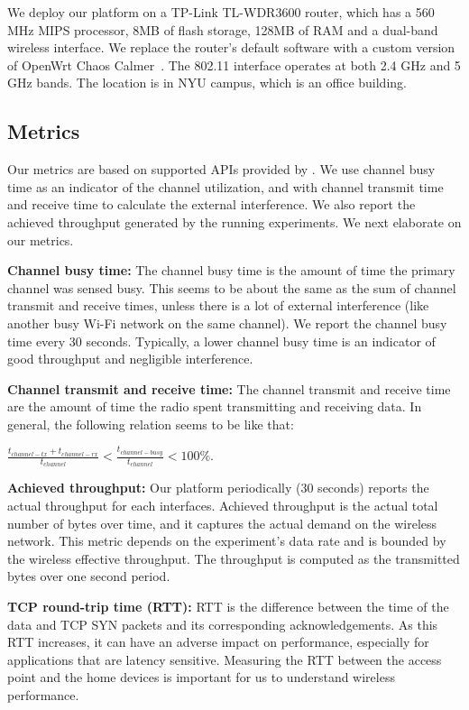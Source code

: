 We deploy our platform on a TP-Link TL-WDR3600 router, which has a 560 MHz MIPS processor, 8MB of flash storage, 128MB of RAM and a dual-band wireless interface. We replace the router's default software with a custom version of OpenWrt Chaos Calmer~\cite{openwrt}. The 802.11 interface operates at both 2.4 GHz and 5 GHz bands. The location is in NYU campus, which is an office building. 

\subsection{Metrics}
\label{ssec.metrics}

Our metrics are based on supported APIs provided by \sysname. We use channel busy time as an indicator of the channel utilization, and with channel transmit time and receive time to calculate the external interference. We also report the achieved throughput generated by the running experiments. We next elaborate on our metrics.

\textbf{Channel busy time:} The channel busy time is the amount of time the primary channel was sensed busy. This seems to be about the same as the sum of channel transmit and receive times, unless there is a lot of external interference (like another busy Wi-Fi network on the same channel)\cite{channelsurvey}. We report the channel busy time every 30 seconds. Typically, a lower channel busy time is an indicator of good throughput and negligible interference.

\textbf{Channel transmit and receive time:} The channel transmit and receive time are the amount of time the radio spent transmitting and receiving data. In general, the following relation seems to be like that: 

\(\frac{t_{channel-tx} + t_{channel-rx}}{t_{channel}} < \frac{t_{channel-busy}}{t_{channel}} < 100\%\).

\textbf{Achieved throughput:} Our platform periodically (30 seconds) reports the actual throughput for each interfaces. Achieved throughput is the actual total number of bytes over time, and it captures the actual demand on the wireless network. This metric depends on the experiment's data rate and is bounded by the wireless effective throughput. The throughput is computed as the transmitted bytes over one second period.

\textbf{TCP round-trip time (RTT):} RTT is the difference between the time of the data and TCP SYN packets and its corresponding acknowledgements. As this RTT increases, it can have an adverse impact on performance, especially for applications that are latency sensitive. Measuring the RTT between the access point and the home devices is important for us to understand wireless performance.

